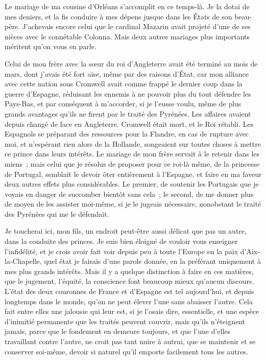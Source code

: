 \documentclass[french,twoside]{book} %
\begin{document}
Le mariage de ma cousine d’Orléans s’accomplit en ce temps-là. Je la dotai de mes deniers, et la fis conduire à mes dépens jusque dans les États de son beau-père. J’achevais encore celui que le cardinal Mazarin avait projeté d’une de ses nièces avec le connétable Colonna. Mais deux autres mariages plus importants méritent qu’on vous en parle.\par
Celui de mon frère avec la sœur du roi d’Angleterre avait été terminé au mois de mars, dont j’avais été fort aise, même par des raisons d’État, car mon alliance avec cette nation sous Cromwell avait comme frappé le dernier coup dans la guerre d’Espagne, réduisant les ennemis à ne pouvoir plus du tout défendre les Pays-Bas, et par conséquent à m’accorder, si je l’eusse voulu, même de plus grands avantages qu’ils ne firent par le traité des Pyrénées. Les affaires avaient depuis changé de face en Angleterre. Cromwell était mort, et le Roi rétabli. Les Espagnols se préparant des ressources pour la Flandre, en cas de rupture avec moi, et n’espérant rien alors de la Hollande, songeaient sur toutes choses à mettre ce prince dans leurs intérêts. Le mariage de mon frère servait à le retenir dans les miens ; mais celui que je résolus de proposer pour ce roi-là même, de la princesse de Portugal, semblait le devoir ôter entièrement à l’Espagne, et faire en ma faveur deux autres effets plus considérables. Le premier, de soutenir les Portugais que je voyais en danger de succomber bientôt sans cela ; le second, de me donner plus de moyen de les assister moi-même, si je le jugeais nécessaire, nonobstant le traité des Pyrénées qui me le défendait.\par
Je toucherai ici, mon fils, un endroit peut-être aussi délicat que pas un autre, dans la conduite des princes. Je suis bien éloigné de vouloir vous enseigner l’infidélité, et je crois avoir fait voir depuis peu à toute l’Europe en la paix d’Aix-la-Chapelle, quel état je faisais d’une parole donnée, en la préférant uniquement à mes plus grands intérêts. Mais il y a quelque distinction à faire en ces matières, que le jugement, l’équité, la conscience font beaucoup mieux qu’aucun discours. L’état des deux couronnes de France et d’Espagne est tel aujourd’hui, et depuis longtemps dans le monde, qu’on ne peut élever l’une sans abaisser l’autre. Cela fait entre elles une jalousie qui leur est, si je l’osais dire, essentielle, et une espèce d’inimitié permanente que les traités peuvent couvrir, mais qu’ils n’éteignent jamais, parce que le fondement en demeure toujours, et que l’une d’elles travaillant contre l’autre, ne croit pas tant nuire à autrui, que se maintenir et se conserver soi-même, devoir si naturel qu’il emporte facilement tous les autres.\par
\end{document}
